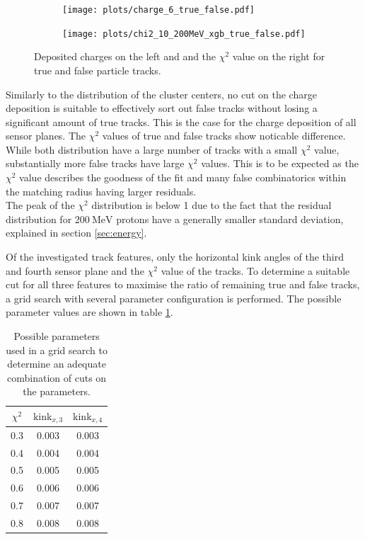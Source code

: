 \begin{figure}
  \hspace{-2.5cm}
  \begin{subfigure}{0.62\textwidth}
      \centering
      \texttt{[image: plots/charge\_6\_true\_false.pdf]}
  \end{subfigure}
  \begin{subfigure}{0.62\textwidth}
      \hspace{0.95cm}
      \texttt{[image: plots/chi2\_10\_200MeV\_xgb\_true\_false.pdf]}
  \end{subfigure}
  \caption{Deposited charges on the left and and the $\chi^2$ value on the right for true and false particle tracks.}
  \label{fig:charge_chi}
\end{figure}

Similarly to the distribution of the cluster centers, no cut on the charge deposition is suitable to effectively sort out false tracks without losing a significant
amount of true tracks. This is the case for the charge deposition of all sensor planes.
The $\chi^2$ values of true and false tracks show noticable difference. While both distribution have a large number of tracks
with a small $\chi^2$ value, substantially more false tracks have large $\chi^2$ values. This is to be expected as the $\chi^2$ value describes the goodness of the fit and
many false combinatorics within the matching radius having larger residuals. \\
The peak of the $\chi^2$ distribution is below 1 due to the fact that the residual distribution
for $\SI{200}{\mega\eV}$ protons have a generally smaller standard deviation, explained in section \ref{sec:energy}.

Of the investigated track features, only the horizontal kink angles of the third and fourth sensor plane and the $\chi^2$ value of the tracks. To determine a suitable
cut for all three features to maximise the ratio of remaining true and false tracks, a grid search with several parameter configuration is performed. The
possible parameter values are shown in table \ref{tab:params}.

\begin{table}
  \centering
  \begin{tabular}{c c c}
    \toprule
    $\chi^2$ & $\text{kink}_{x,3}$ & $\text{kink}_{x,4}$\\
    \midrule
    0.3 & 0.003 & 0.003 \\
    0.4 & 0.004 & 0.004 \\
    0.5 & 0.005 & 0.005 \\
    0.6 & 0.006 & 0.006 \\
    0.7 & 0.007 & 0.007 \\
    0.8 & 0.008 & 0.008
  \end{tabular}
  \caption{Possible parameters used in a grid search to determine an adequate combination of cuts on the parameters.}
  \label{tab:params}
\end{table}


